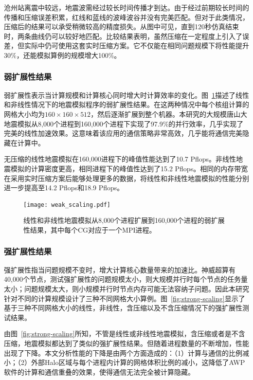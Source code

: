 沧州站离震中较远，地震波需经过较长时间传播才到达。由于经过前期较长时间的传播和压缩误差积累，红线和蓝线的波峰波谷并没有完美匹配。但对于此类情况，压缩后的结果可以承受稍微较高的精度损失。从图中可见，直到120秒仿真结束时，两条曲线仍可以较好地匹配。比较结果表明，虽然压缩在一定程度上引入了误差，但实际中仍可使用这套实时压缩方案。它不仅能在相同问题规模下将性能提升30\%，还能模拟算例的规模增大100\%。

\subsubsection{弱扩展性结果}

弱扩展性表示当计算规模和计算核心同时增大时计算效率的变化。图~\ref {fig:weak-scaling}描述了线性和非线性情况下的地震模拟程序的弱扩展性结果。在这两种情况中每个核组计算的网格大小均为$160\times 160 \times 512$，然后逐渐扩展到整个机器。本研究的大规模唐山大地震模拟从8,000个进程到160,000个进程下实现了97.9\%的并行效率，几乎实现了完美的线性加速效果。这意味着该应用的通信策略非常高效，几乎能将通信完美隐藏在计算中。

无压缩的线性地震模拟在160,000进程下的峰值性能达到了10.7 Pflops。非线性地震模拟的计算密度更高，相同进程下的峰值性达到了15.2 Pflops。相同的内存带宽在采用实时压缩方案后能够处理更多的数据，将线性和非线性地震模拟的性能分别进一步提高至14.2 Pflops和18.9 Pflops。

\begin{figure}[ht]
\centering
\texttt{[image: weak\_scaling.pdf]}
\caption{线性和非线性地震模拟从8,000个进程扩展到160,000个进程的弱扩展性结果，其中每个CG对应于一个MPI进程。}
\label{fig:weak-scaling}
\end{figure}

\subsubsection{强扩展性结果}

强扩展性指当问题规模不变时，增大计算核心数量带来的加速比。神威超算有40,000个节点，测试强扩展性的问题规模太小，则大规模并行时每个节点的任务量太小；问题规模太大，则小规模并行时节点内存可能无法容纳子问题。因此本研究针对不同的计算规模设计了三种不同网格大小算例。图~\ref {fig:strong-scaling}显示了基于三种不同网格大小的线性，非线性，含压缩以及不含压缩情况下的强扩展性测试结果。 

由图~\ref {fig:strong-scaling}所知，不管是线性或非线性地震模拟，含压缩或者是不含压缩，地震模拟都达到了类似的强扩展性结果。但随着进程数量的不断增加，性能出现了下降。本文分析性能的下降是由两个方面造成的：（1）计算与通信的比例减小；（2）外部Halo区域与每个进程内计算的网格体积比例的减小，这降低了AWP软件的计算和通信重叠的效果，使得通信无法完全被计算隐藏。

